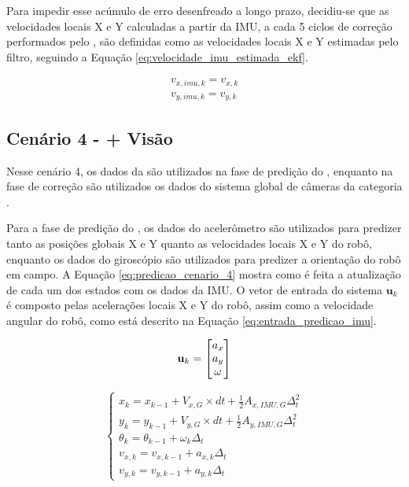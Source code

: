 \documentclass[acronym, symbols, table]{fei}
\begin{document}
			Para impedir esse acúmulo de erro desenfreado a longo prazo, decidiu-se que as velocidades locais X e Y calculadas a partir da IMU, a cada 5 ciclos de correção performados pelo , são definidas como as velocidades locais X e Y estimadas pelo filtro, seguindo a Equação \ref{eq:velocidade_imu_estimada_ekf}.
			
			\begin{align}\label{eq:velocidade_imu_estimada_ekf}
				v_{x,imu,k} = v_{x,k} \\
				v_{y,imu,k} = v_{y,k}
			\end{align}
		
		\subsection{Cenário 4 -  + Visão} \label{sec:implementacao_cenario_4}
		
			Nesse cenário 4, os dados da  são utilizados na fase de predição do , enquanto na fase de correção são utilizados os dados do sistema global de câmeras da categoria .
			
			Para a fase de predição do , os dados do acelerômetro são utilizados para predizer tanto as posições globais X e Y quanto as velocidades locais X e Y do robô, enquanto os dados do giroscópio são utilizados para predizer a orientação do robô em campo. A Equação \ref{eq:predicao_cenario_4} mostra como é feita a atualização de cada um dos estados com os dados da IMU. O vetor de entrada do sistema $\textbf{u}_k$ é composto pelas acelerações locais X e Y do robô, assim como a velocidade angular do robô, como está descrito na Equação \ref{eq:entrada_predicao_imu}.
			
			\begin{equation}\label{eq:entrada_predicao_imu}
				\text{\textbf{u}}_k =
				\begin{bmatrix}
					a_{x} \\
					a_{y} \\
					\omega
				\end{bmatrix}
			\end{equation}
			
			\begin{equation}\label{eq:predicao_cenario_4}
				\begin{cases}
					x_{k} = x_{k-1} + V_{x,G} \times dt + \frac{1}{2}A_{x,IMU,G} \Delta_t^2 \\
					y_{k} = y_{k-1} + V_{y,G} \times dt + \frac{1}{2}A_{y,IMU,G} \Delta_t^2 \\
					\theta_{k} = \theta_{k-1} + \omega_{k} \Delta_t \\
					v_{x,k} = v_{x,k-1} + a_{x,k} \Delta_t\\
					v_{y,k} = v_{y,k-1} + a_{y,k} \Delta_t
				\end{cases}
			\end{equation}
\end{document}
